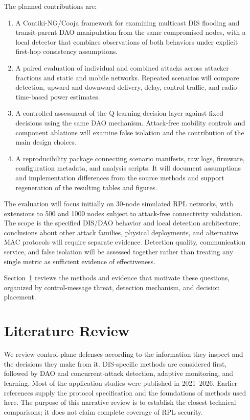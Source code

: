 \documentclass[journal]{IEEEtran}
\begin{document}
The planned contributions are:
\begin{enumerate}
\item A Contiki-NG/Cooja framework for examining multicast DIS flooding and transit-parent DAO manipulation from the same compromised nodes, with a local detector that combines observations of both behaviors under explicit first-hop consistency assumptions.
\item A paired evaluation of individual and combined attacks across attacker fractions and static and mobile networks. Repeated scenarios will compare detection, upward and downward delivery, delay, control traffic, and radio-time-based power estimates.
\item A controlled assessment of the Q-learning decision layer against fixed decisions using the same DAO mechanism. Attack-free mobility controls and component ablations will examine false isolation and the contribution of the main design choices.
\item A reproducibility package connecting scenario manifests, raw logs, firmware, configuration metadata, and analysis scripts. It will document assumptions and implementation differences from the source methods and support regeneration of the resulting tables and figures.
\end{enumerate}

The evaluation will focus initially on 30-node simulated RPL networks, with extensions to 500 and 1000 nodes subject to attack-free connectivity validation. The scope is the specified DIS/DAO behavior and local detection architecture; conclusions about other attack families, physical deployments, and alternative MAC protocols will require separate evidence. Detection quality, communication service, and false isolation will be assessed together rather than treating any single metric as sufficient evidence of effectiveness.

Section~\ref{sec:related} reviews the methods and evidence that motivate these questions, organized by control-message threat, detection mechanism, and decision placement.

\section{Literature Review}\label{sec:related}
We review control-plane defenses according to the information they inspect and the decisions they make from it. DIS-specific methods are considered first, followed by DAO and concurrent-attack detection, adaptive monitoring, and learning. Most of the application studies were published in 2021--2026. Earlier references supply the protocol specification and the foundations of methods used here. The purpose of this narrative review is to establish the closest technical comparisons; it does not claim complete coverage of RPL security.
\end{document}
